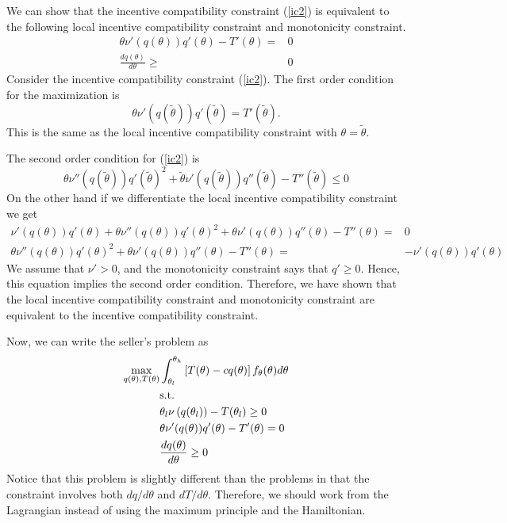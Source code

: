 We can show that the incentive compatibility constraint (\ref{ic2}) is
equivalent to the following local incentive 
compatibility constraint and monotonicity constraint.
\begin{align}
  \theta \nu'(q(\theta))q'(\theta) - T'(\theta) = & 0 \label{lic} \\
  \frac{dq(\theta)}{d\theta} \geq & 0 \label{mon}
\end{align}
Consider the incentive compatibility constraint
(\ref{ic2}). The first order condition for the maximization is
\[ \theta \nu'(q(\tilde{\theta})) q'(\tilde{\theta}) =
T'(\tilde{\theta}). \]
This is the same as the local incentive compatibility constraint with
$\theta = \tilde{\theta}$.

The second order condition for (\ref{ic2}) is 
\[ \theta \nu''(q(\tilde{\theta}))q'(\tilde{\theta})^2 +
\tilde{\theta} \nu'(q(\tilde{\theta})) q''(\tilde{\theta}) -
T''(\tilde{\theta}) \leq 0 \]   
On the other hand if we differentiate the local incentive
compatibility constraint we get 
\begin{align*}
  \nu'(q(\theta))q'(\theta) + \theta \nu''(q(\theta)) q'(\theta)^2 + \theta
  \nu'(q(\theta)) q''(\theta) - T''(\theta) = & 0 \\
  \theta \nu''(q(\theta)) q'(\theta)^2 + \theta
  \nu'(q(\theta)) q''(\theta) - T''(\theta) = & -\nu'(q(\theta))q'(\theta)  
\end{align*}
We assume that $\nu'>0$, and the monotonicity constraint says that
$q'\geq 0$. Hence, this equation implies the second order
condition. Therefore, we have shown that the local incentive
compatibility constraint and monotonicity constraint are equivalent to the
incentive compatibility constraint.

Now, we can write the seller's problem as
\begin{align}
  \max_{q(\theta),T(\theta)} & \int_{\theta_l}^{\theta_h} 
  \left[T(\theta) - cq(\theta)\right]
  f_\theta(\theta) d\theta \notag \\
  & \text{s.t.} \notag \\
  &\theta_l \nu\left(q(\theta_l)\right) - T(\theta_l) \geq 0
  \label{pcl} \\
  & \theta \nu'(q(\theta))q'(\theta) - T'(\theta) =  0 \label{lic2} \\
  & \frac{dq(\theta)}{d\theta} \geq  0 \label{mon2}
\end{align}
Notice that this problem is slightly different than the problems in
that the constraint involves both $dq/d\theta$ and
$dT/d\theta$. Therefore, we should work from the Lagrangian instead of
using the maximum principle and the Hamiltonian.

